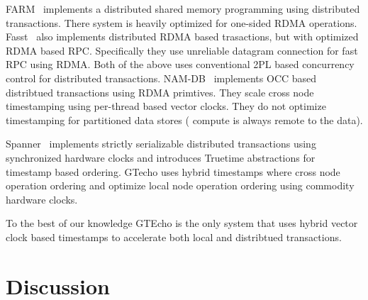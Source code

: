 FARM~\cite{farm} implements a distributed shared memory programming using distributed 
transactions. There system is heavily optimized for one-sided RDMA operations.
Fasst~\cite{fasst} also implements distributed RDMA based trasactions, but with 
optimized RDMA based RPC. Specifically they use unreliable datagram connection
for fast RPC using RDMA. Both of the above uses conventional 2PL based concurrency
control for distributed transactions. NAM-DB~\cite{namdb} implements OCC based 
distribtued transactions using RDMA primtives. They scale cross node timestamping
using per-thread based vector clocks. They do not optimize timestamping for 
partitioned data stores ( compute is always remote to the data).

Spanner~\cite{spanner} implements strictly serializable distributed transactions
using synchronized hardware clocks and introduces Truetime abstractions for 
timestamp based ordering. GTecho uses hybrid timestamps where cross node operation
ordering and optimize local node operation ordering using commodity hardware clocks.

To the best of our knowledge GTEcho is the only system that uses hybrid vector
clock based timestamps to accelerate both local and distribtued transactions.



\section{Discussion}
